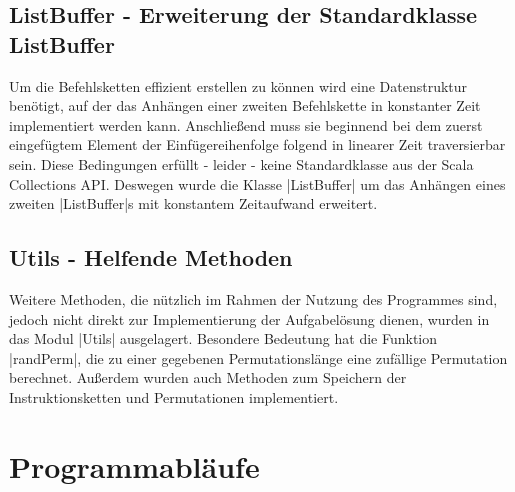 \subsection{ListBuffer - Erweiterung der Standardklasse ListBuffer}
Um die Befehlsketten effizient erstellen zu können wird eine Datenstruktur benötigt,
auf der das Anhängen einer zweiten Befehlskette in konstanter Zeit implementiert werden kann.
Anschließend muss sie beginnend bei dem zuerst eingefügtem Element der Einfügereihenfolge folgend in linearer Zeit traversierbar sein.
Diese Bedingungen erfüllt - leider - keine Standardklasse aus der Scala Collections API.
Deswegen wurde die Klasse |ListBuffer| um das Anhängen eines zweiten |ListBuffer|s mit konstantem Zeitaufwand erweitert.

\subsection{Utils - Helfende Methoden}
Weitere Methoden, die nützlich im Rahmen der Nutzung des Programmes sind, jedoch nicht direkt zur Implementierung der Aufgabelösung dienen,
wurden in das Modul |Utils| ausgelagert. Besondere Bedeutung hat die Funktion |randPerm|, die zu einer gegebenen Permutationslänge
eine zufällige Permutation berechnet. %
Außerdem wurden auch Methoden zum Speichern der Instruktionsketten und Permutationen implementiert.

\clearpage
\section{Programmabläufe}
